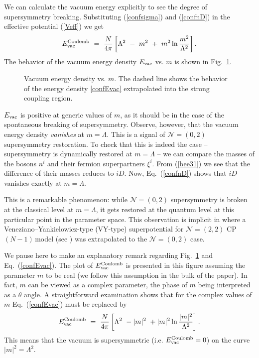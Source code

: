 \documentclass[epsfig,12pt]{article}
\def\beq{\begin{equation}}
\def\eeq{\end{equation}}
\newcommand{\cpn}{CP$(N-1)\,$}
\def\beq{\begin{equation}}
\def\eeq{\end{equation}}
\newcommand{\ntwot}{${\mathcal N}= \left(2,2\right) $ }
\newcommand{\ntwoo}{${\mathcal N}= \left(0,2\right) $ }
\begin{document}
{We can calculate the vacuum energy  explicitly to see  the degree of supersymmetry breaking.
Substituting (\ref{confsigma}) and (\ref{confnD}) in the effective potential (\ref{Veff})
we get
\beq
E_{\rm vac}^{\rm Coulomb}~=~\frac{N}{4\pi}\left[ \Lambda^2~-~m^2~+~m^2\ln {\frac{m^2}{\Lambda^2}}\right].
\label{confEvac}
\eeq
The behavior of the vacuum energy density $E_{\rm vac}$ vs. $m$ is shown  in Fig.~\ref{figvacE}.

\begin{figure}
\epsfxsize=10cm
\centerline{}
\caption{\small Vacuum energy density vs. $m$. The dashed line shows the behavior of the
energy density \eqref{confEvac} extrapolated into the strong coupling region.} 
\label{figvacE}
\end{figure}

$E_{\rm vac}$ is positive  at generic values of $m$, as it should be in the
 case of the spontaneous breaking of supersymmetry.
Observe, however, that the vacuum energy density {\em vanishes}
at $m=\Lambda$. This is a signal of \ntwoo supersymmetry restoration. To check that this
is indeed the case -- supersymmetry is dynamically restored at  $m=\Lambda$ -- we can
compare the masses of the bosons $n^i$ and their fermion superpartners $\xi^i$. 
From (\ref{bee31}) we see that the difference of 
their masses reduces to $iD$. Now, Eq.~(\ref{confnD}) shows that $iD$ vanishes exactly at $m=\Lambda$.

This is a remarkable phenomenon: while \ntwoo supersymmetry is broken at the classical level
at $m=\Lambda$, 
it gets restored at the quantum level at this particular point in the parameter space. 
This  observation is implicit
 in \cite{Tonghetdyn} where a Veneziano--Yankielowicz-type (VY-type)
 superpotential  \cite{VYan} for  \ntwot \cpn model (see \cite{AdDVecSal,ChVa,W93}) was
 extrapolated to   the \ntwoo  case.

We pause here to make an explanatory remark regarding Fig.~\ref{figvacE} and Eq.~(\ref{confEvac}).
The plot of $E_{\rm vac}^{\rm Coulomb}$ is presented in this figure assuming the parameter $m$
to be real (we follow this assumption in the bulk of the paper). In fact, $m$ can be viewed as a complex parameter,
the phase of $m$ being interpreted as a $\theta$ angle. A straightforward examination shows
that for the complex values of $m$ Eq.~(\ref{confEvac}) must be replaced by
$$
E_{\rm vac}^{\rm Coulomb}~=~\frac{N}{4\pi}\left[ \Lambda^2~-|m|^2~+|m|^2\ln {\frac{|m|^2}{\Lambda^2}}\right].
$$
This means that the vacuum is supersymmetric (i.e. $E_{\rm vac}^{\rm Coulomb}=0$) on the curve
$|m|^2=\Lambda^2$.

}
\end{document}
